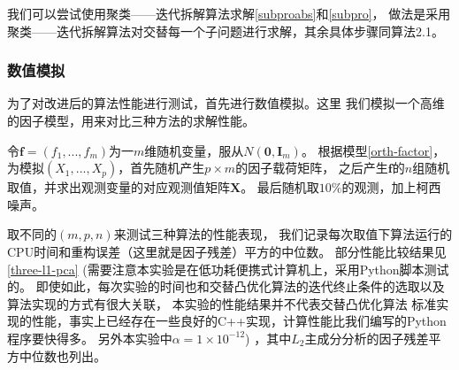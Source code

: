 我们可以尝试使用聚类——迭代拆解算法求解\eqref{subproabs}和\eqref{subpro}，
做法是采用聚类——迭代拆解算法对交替每一个子问题进行求解，其余具体步骤同算法2.1。

\subsubsection{数值模拟}
为了对改进后的算法性能进行测试，首先进行数值模拟。这里
我们模拟一个高维的因子模型，用来对比三种方法的求解性能。

令$\bm{f} = (f_1, ..., f_m)$为一$m$维随机变量，服从$N(\bm{0}, \bm{I}_m)$。
根据模型\eqref{orth-factor}，为模拟$(X_1, ..., X_p)$，首先随机产生$p\times m$的因子载荷矩阵，
之后产生$\bm{f}$的$n$组随机取值，并求出观测变量的对应观测值矩阵$\bm X $。
最后随机取$10\%$的观测，加上柯西噪声。

取不同的$(m, p, n)$来测试三种算法的性能表现，
我们记录每次取值下算法运行的CPU时间和重构误差（这里就是因子残差）平方的中位数。
部分性能比较结果见\ref{three-l1-pca}
(需要注意本实验是在低功耗便携式计算机上，采用Python脚本测试的。
即使如此，每次实验的时间也和交替凸优化算法的迭代终止条件的选取以及算法实现的方式有很大关联，
本实验的性能结果并不代表交替凸优化算法
标准实现的性能，事实上已经存在一些良好的C++实现，计算性能比我们编写的Python程序要快得多。
另外本实验中$\alpha = 1\times10^{-12}$)
，其中$L_2$主成分分析的因子残差平方中位数也列出。

